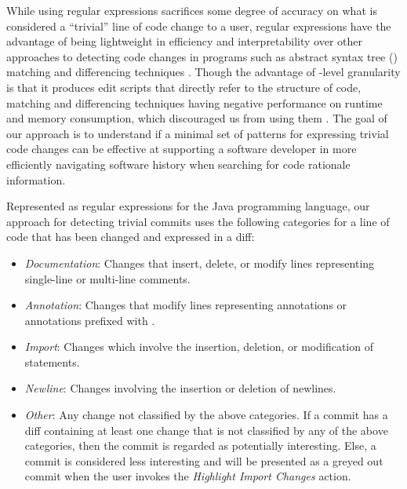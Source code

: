 While using regular expressions sacrifices some degree of accuracy on what is considered a ``trivial'' line of code change to a user,
regular expressions have the advantage of being lightweight in efficiency and interpretability over other approaches to detecting code changes in programs such as abstract syntax tree () matching and differencing techniques \cite{murphy_lightweight_1996}.
Though the advantage of -level granularity is that it produces edit scripts that directly refer to the structure of code,  matching and differencing techniques having negative performance on runtime and memory consumption, which discouraged us from using them \cite{fluri_change_2007,pawlik_RTED_2011,falleri_fine-grained_2014}.
The goal of our approach is to understand if a minimal set of patterns for expressing trivial code changes can be effective at supporting a software developer in more efficiently navigating software history when searching for code rationale information.

Represented as regular expressions for the Java programming language, our approach for detecting trivial commits uses the following categories for a line of code that has been changed and expressed in a diff: 

\begin{itemize}
    \item \textit{Documentation}: Changes that insert, delete, or modify lines representing single-line or multi-line comments.
    \item \textit{Annotation}: Changes that modify lines representing  annotations or annotations prefixed with .
    \item \textit{Import}: Changes which involve the insertion, deletion, or modification of  statements.
    \item \textit{Newline}: Changes involving the insertion or deletion of newlines.
    \item \textit{Other}: Any change not classified by the above categories. If a commit has a diff containing at least one change that is not classified by any of the above categories, then the commit is regarded as potentially interesting. Else, a commit is considered less interesting and will be presented as a greyed out commit when the user invokes the \emph{Highlight Import Changes} action.
\end{itemize}

